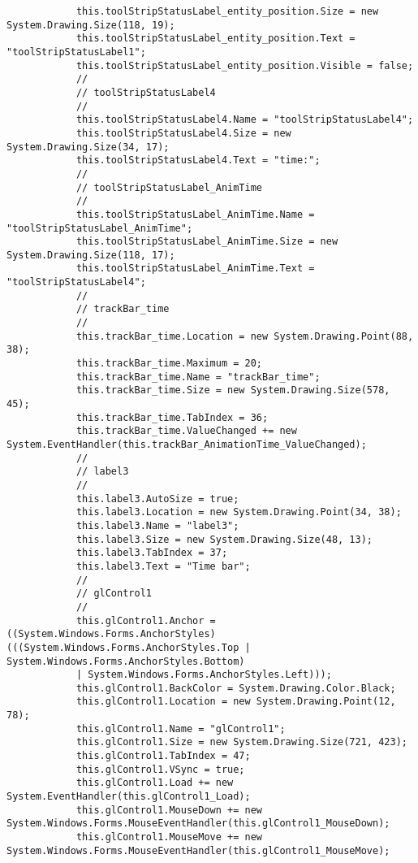 \begin{scriptsize}
\begin{verbatim}
            this.toolStripStatusLabel_entity_position.Size = new System.Drawing.Size(118, 19);
            this.toolStripStatusLabel_entity_position.Text = "toolStripStatusLabel1";
            this.toolStripStatusLabel_entity_position.Visible = false;
            // 
            // toolStripStatusLabel4
            // 
            this.toolStripStatusLabel4.Name = "toolStripStatusLabel4";
            this.toolStripStatusLabel4.Size = new System.Drawing.Size(34, 17);
            this.toolStripStatusLabel4.Text = "time:";
            // 
            // toolStripStatusLabel_AnimTime
            // 
            this.toolStripStatusLabel_AnimTime.Name = "toolStripStatusLabel_AnimTime";
            this.toolStripStatusLabel_AnimTime.Size = new System.Drawing.Size(118, 17);
            this.toolStripStatusLabel_AnimTime.Text = "toolStripStatusLabel4";
            // 
            // trackBar_time
            // 
            this.trackBar_time.Location = new System.Drawing.Point(88, 38);
            this.trackBar_time.Maximum = 20;
            this.trackBar_time.Name = "trackBar_time";
            this.trackBar_time.Size = new System.Drawing.Size(578, 45);
            this.trackBar_time.TabIndex = 36;
            this.trackBar_time.ValueChanged += new System.EventHandler(this.trackBar_AnimationTime_ValueChanged);
            // 
            // label3
            // 
            this.label3.AutoSize = true;
            this.label3.Location = new System.Drawing.Point(34, 38);
            this.label3.Name = "label3";
            this.label3.Size = new System.Drawing.Size(48, 13);
            this.label3.TabIndex = 37;
            this.label3.Text = "Time bar";
            // 
            // glControl1
            // 
            this.glControl1.Anchor = ((System.Windows.Forms.AnchorStyles)(((System.Windows.Forms.AnchorStyles.Top | System.Windows.Forms.AnchorStyles.Bottom) 
            | System.Windows.Forms.AnchorStyles.Left)));
            this.glControl1.BackColor = System.Drawing.Color.Black;
            this.glControl1.Location = new System.Drawing.Point(12, 78);
            this.glControl1.Name = "glControl1";
            this.glControl1.Size = new System.Drawing.Size(721, 423);
            this.glControl1.TabIndex = 47;
            this.glControl1.VSync = true;
            this.glControl1.Load += new System.EventHandler(this.glControl1_Load);
            this.glControl1.MouseDown += new System.Windows.Forms.MouseEventHandler(this.glControl1_MouseDown);
            this.glControl1.MouseMove += new System.Windows.Forms.MouseEventHandler(this.glControl1_MouseMove);

\end{verbatim}
\end{scriptsize}

